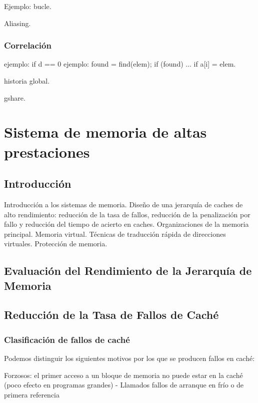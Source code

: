 \documentclass[12pt,onecolumn]{memoir}
\begin{document}
Ejemplo: bucle.

Aliasing.

\subsection{Correlación}

ejemplo: if d == 0
ejemplo: found = find(elem); if (found) ...  if a[i] = elem.

historia global.

gshare.


\chapter{Sistema de memoria de altas prestaciones}
\label{cap:memoria}


\section{Introducción}
\label{sec:introduccion_memoria}

Introducción a los sistemas de memoria. Diseño de una jerarquía de caches de alto rendimiento: reducción de la tasa de fallos,  reducción de la penalización por fallo y reducción del tiempo de acierto en caches. Organizaciones de la memoria principal. Memoria virtual. Técnicas de traducción rápida de direcciones virtuales. Protección de memoria.

\section{Evaluación del Rendimiento de la Jerarquía de Memoria}

\section{Reducción de la Tasa de Fallos de Caché}

\subsection{Clasificación de fallos de caché}

Podemos distinguir los siguientes motivos por los que se 
producen fallos en caché:

Forzosos: el primer acceso a un bloque de memoria no puede 
estar en la caché (poco efecto en programas grandes)
- Llamados fallos de arranque en frío o de primera referencia
\end{document}
